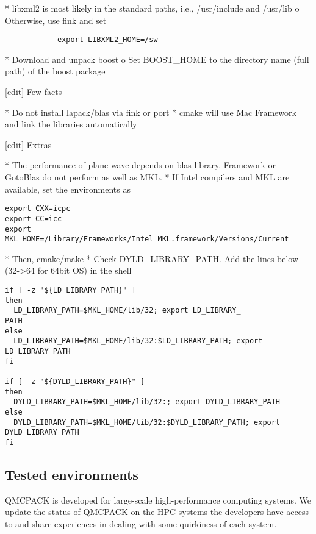     * libxml2 is most likely in the standard paths, i.e., /usr/include and /usr/lib
          o Otherwise, use fink and set

\begin{verbatim}
            export LIBXML2_HOME=/sw
\end{verbatim}

    * Download and unpack boost
          o Set BOOST\_HOME to the directory name (full path) of the boost package 

[edit] Few facts

    * Do not install lapack/blas via fink or port
    * cmake will use Mac Framework and link the libraries automatically 

[edit] Extras

    * The performance of plane-wave depends on blas library. Framework or GotoBlas do not perform as well as MKL.
    * If Intel compilers and MKL are available, set the environments as 

\begin{verbatim}
export CXX=icpc
export CC=icc
export MKL_HOME=/Library/Frameworks/Intel_MKL.framework/Versions/Current
\end{verbatim}

    * Then, cmake/make
    * Check DYLD\_LIBRARY\_PATH. Add the lines below (32->64 for 64bit OS) in the shell 

\begin{verbatim}
if [ -z "${LD_LIBRARY_PATH}" ]
then
  LD_LIBRARY_PATH=$MKL_HOME/lib/32; export LD_LIBRARY_
PATH
else
  LD_LIBRARY_PATH=$MKL_HOME/lib/32:$LD_LIBRARY_PATH; export LD_LIBRARY_PATH
fi

if [ -z "${DYLD_LIBRARY_PATH}" ]
then
  DYLD_LIBRARY_PATH=$MKL_HOME/lib/32:; export DYLD_LIBRARY_PATH
else
  DYLD_LIBRARY_PATH=$MKL_HOME/lib/32:$DYLD_LIBRARY_PATH; export DYLD_LIBRARY_PATH
fi
\end{verbatim}

\subsection{Tested environments}
QMCPACK is developed for large-scale high-performance computing systems. We update the status of QMCPACK on the HPC systems the developers have access to and share experiences in dealing with some quirkiness of each system.

